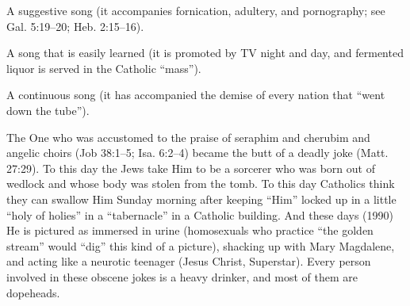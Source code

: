 {\begin{compactenum}
\item A suggestive song (it accompanies fornication, adultery, and pornography; see Gal. 5:19--20; Heb. 2:15--16).
\item A song that is easily learned (it is promoted by TV night and day, and fermented liquor is served in the Catholic “mass”).
\item A continuous song (it has accompanied the demise of every nation that “went down the
tube”).
\end{compactenum}
The One who was accustomed to the praise of seraphim and cherubim and angelic choirs (Job 38:1–5; Isa. 6:2–4) became the butt of a deadly joke (Matt. 27:29). To this day the Jews take Him to be a sorcerer who was born out of wedlock and whose body was stolen from the tomb. To this day Catholics think they can swallow Him Sunday morning after keeping “Him” locked up in a little “holy of holies” in a “tabernacle” in a Catholic building. And these days (1990) He is pictured as immersed in urine (homosexuals who practice “the golden stream” would “dig” this kind of a picture), shacking up with Mary Magdalene, and acting like a neurotic teenager (Jesus Christ, Superstar). Every person involved in these obscene jokes is a heavy drinker, and most of them are dopeheads.}
